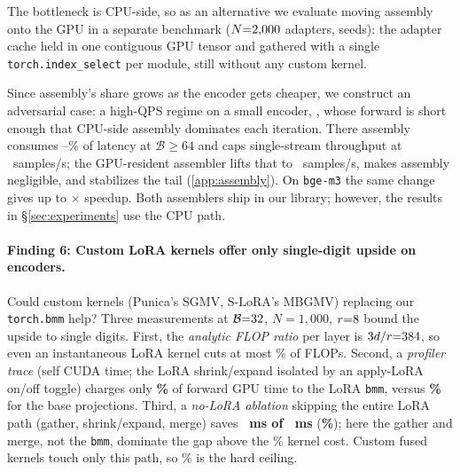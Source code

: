 \documentclass[11pt]{article}
\newcommand{\sysname}{LateFuse}
\begin{document}
The bottleneck is CPU-side, so as an alternative we evaluate moving assembly
onto the GPU in a separate benchmark ($N{=}2{,}000{}$ adapters, \AsmSeeds{}
seeds): the adapter cache held in one contiguous GPU tensor and gathered with a
single \texttt{torch.index\_select} per module, still without any
custom kernel.

Since assembly's share grows as the encoder gets cheaper, we
construct an adversarial case: a high-QPS regime on a small encoder,
\MiniLmName{} \cite{reimers2019sentencebert}, whose forward is
short enough that
CPU-side assembly dominates each iteration.
There assembly consumes
\MiniLmBaselineShareLoPct--\MiniLmBaselineShareHiPct\% of latency at
$\mathcal{B} \geq 64$ and caps single-stream throughput at
\MiniLmBaselineTputMax{}~samples/s; the GPU-resident assembler lifts that to
\MiniLmIdxSelTputMax{}~samples/s, makes assembly negligible, and stabilizes the
tail (\ref{app:assembly}). On \texttt{bge-m3} the same change gives up to
\IdxSelSpeedupMax$\times$ speedup. Both assemblers ship in our library; however, the
results in \S\ref{sec:experiments} use the CPU path.

\paragraph{Finding 6: Custom LoRA kernels offer only single-digit upside on
encoders.}
\label{sec:results_custom_kernels}
Could custom kernels (Punica's SGMV, S-LoRA's MBGMV)
replacing our \texttt{torch.bmm} help? Three measurements
at $\mathcal{B}{=}32$, $N{=}1{,}000$, $r{=}8$ bound the
upside to single digits. First, the \emph{analytic FLOP ratio} per layer is
$3d/r{=}384$, so even an instantaneous LoRA kernel
cuts at most
\FlopMaxLoraSavingsPct\% of FLOPs. Second, a \emph{profiler trace} (self CUDA
time; the LoRA shrink/expand isolated by an apply-LoRA on/off toggle) charges only
\textbf{\ProfLoraBmmIsolatedPct\%} of forward GPU time to the LoRA \texttt{bmm},
versus \textbf{\ProfBaseLinearPct\%} for the base projections. Third, a
\emph{no-LoRA ablation} skipping the entire LoRA path (gather, shrink/expand,
merge) saves \textbf{\AblationLoraCostMs~ms of \AblationLoraOnMs~ms}
(\textbf{\AblationLoraCostPct\%}); here the gather and merge,
not the \texttt{bmm}, dominate the gap above the
\ProfLoraBmmIsolatedPct\% kernel cost. Custom fused
kernels touch only this path, so \AblationLoraCostPct\% is the hard
ceiling.

\end{document}
